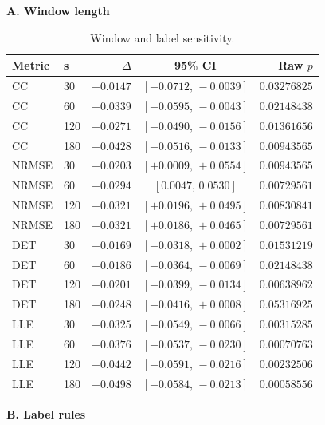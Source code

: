 \documentclass[conference,a4paper]{IEEEtran}
\renewcommand{\thetable}{S\arabic{table}}
\begin{document}
\begin{table}[!t]
\renewcommand{\thetable}{S\arabic{table}A}
\centering
\caption{Window and label sensitivity.}\label{tab:supp_sensitivity}
\footnotesize
\setlength{\tabcolsep}{1.5pt}
\renewcommand{\arraystretch}{1.12}
\begin{minipage}[t]{0.49\textwidth}
\raggedright\textbf{A. Window length}\par\smallskip
\begin{tabular*}{\linewidth}{@{\extracolsep{\fill}}llrcr@{}}
\toprule
Metric & s & $\Delta$ & 95\% CI & Raw $p$\\
\midrule
CC & 30 & $-0.0147$ & $[-0.0712,\,-0.0039]$ & $0.03276825$\\
CC & 60 & $-0.0339$ & $[-0.0595,\,-0.0043]$ & $0.02148438$\\
CC & 120 & $-0.0271$ & $[-0.0490,\,-0.0156]$ & $0.01361656$\\
CC & 180 & $-0.0428$ & $[-0.0516,\,-0.0133]$ & $0.00943565$\\
NRMSE & 30 & $+0.0203$ & $[+0.0009,\,+0.0554]$ & $0.00943565$\\
NRMSE & 60 & $+0.0294$ & $[0.0047,\,0.0530]$ & $0.00729561$\\
NRMSE & 120 & $+0.0321$ & $[+0.0196,\,+0.0495]$ & $0.00830841$\\
NRMSE & 180 & $+0.0321$ & $[+0.0186,\,+0.0465]$ & $0.00729561$\\
DET & 30 & $-0.0169$ & $[-0.0318,\,+0.0002]$ & $0.01531219$\\
DET & 60 & $-0.0186$ & $[-0.0364,\,-0.0069]$ & $0.02148438$\\
DET & 120 & $-0.0201$ & $[-0.0399,\,-0.0134]$ & $0.00638962$\\
DET & 180 & $-0.0248$ & $[-0.0416,\,+0.0008]$ & $0.05316925$\\
LLE & 30 & $-0.0325$ & $[-0.0549,\,-0.0066]$ & $0.00315285$\\
LLE & 60 & $-0.0376$ & $[-0.0537,\,-0.0230]$ & $0.00070763$\\
LLE & 120 & $-0.0442$ & $[-0.0591,\,-0.0216]$ & $0.00232506$\\
LLE & 180 & $-0.0498$ & $[-0.0584,\,-0.0213]$ & $0.00058556$\\
\bottomrule
\end{tabular*}
\end{minipage}\hfill\begin{minipage}[t]{0.49\textwidth}
\raggedright\textbf{B. Label rules}\par\smallskip

\end{minipage}
\end{table}
\end{document}
